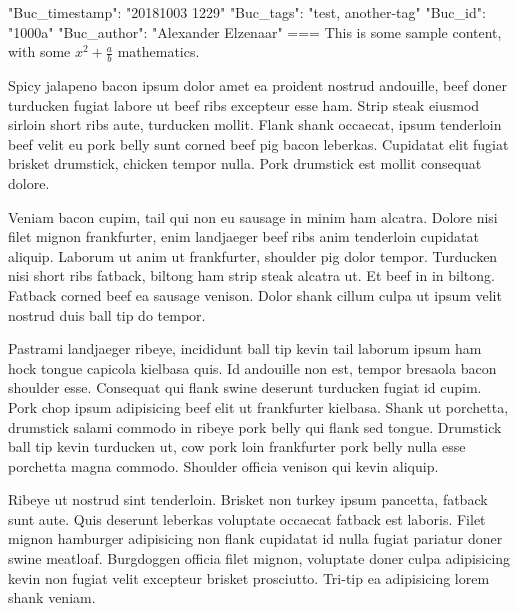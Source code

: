 {"Buc_timestamp": "20181003 1229"}
{"Buc_tags": "test, another-tag"}
{"Buc_id": "1000a"}
{"Buc_author": "Alexander Elzenaar"}
===
This is some sample content, with some $ x^2 + \frac{a}{b} $ mathematics.

Spicy jalapeno bacon ipsum dolor amet ea proident nostrud andouille, beef doner turducken fugiat labore ut beef ribs excepteur esse ham. Strip steak eiusmod sirloin short ribs aute, turducken mollit. Flank shank occaecat, ipsum tenderloin beef velit eu pork belly sunt corned beef pig bacon leberkas. Cupidatat elit fugiat brisket drumstick, chicken tempor nulla. Pork drumstick est mollit consequat dolore.

Veniam bacon cupim, tail qui non eu sausage in minim ham alcatra. Dolore nisi filet mignon frankfurter, enim landjaeger beef ribs anim tenderloin cupidatat aliquip. Laborum ut anim ut frankfurter, shoulder pig dolor tempor. Turducken nisi short ribs fatback, biltong ham strip steak alcatra ut. Et beef in in biltong. Fatback corned beef ea sausage venison. Dolor shank cillum culpa ut ipsum velit nostrud duis ball tip do tempor.

Pastrami landjaeger ribeye, incididunt ball tip kevin tail laborum ipsum ham hock tongue capicola kielbasa quis. Id andouille non est, tempor bresaola bacon shoulder esse. Consequat qui flank swine deserunt turducken fugiat id cupim. Pork chop ipsum adipisicing beef elit ut frankfurter kielbasa. Shank ut porchetta, drumstick salami commodo in ribeye pork belly qui flank sed tongue. Drumstick ball tip kevin turducken ut, cow pork loin frankfurter pork belly nulla esse porchetta magna commodo. Shoulder officia venison qui kevin aliquip.

Ribeye ut nostrud sint tenderloin. Brisket non turkey ipsum pancetta, fatback sunt aute. Quis deserunt leberkas voluptate occaecat fatback est laboris. Filet mignon hamburger adipisicing non flank cupidatat id nulla fugiat pariatur doner swine meatloaf. Burgdoggen officia filet mignon, voluptate doner culpa adipisicing kevin non fugiat velit excepteur brisket prosciutto. Tri-tip ea adipisicing lorem shank veniam.
